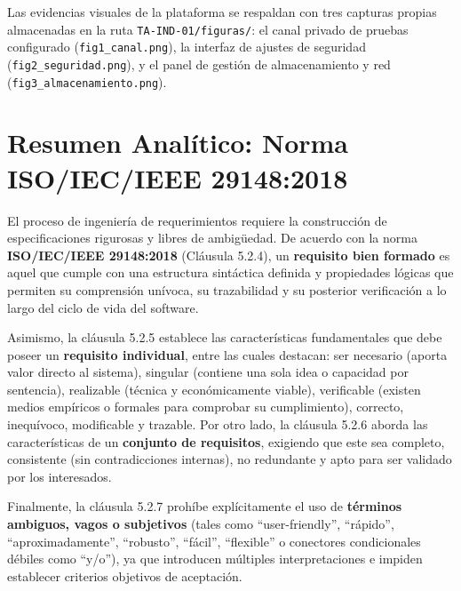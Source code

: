 \documentclass[11pt,a4paper]{article}
\begin{document}
Las evidencias visuales de la plataforma se respaldan con tres capturas propias almacenadas en la ruta \texttt{TA-IND-01/figuras/}: el canal privado de pruebas configurado (\texttt{fig1\_canal.png}), la interfaz de ajustes de seguridad (\texttt{fig2\_seguridad.png}), y el panel de gestión de almacenamiento y red (\texttt{fig3\_almacenamiento.png}).

\section{Resumen Analítico: Norma ISO/IEC/IEEE 29148:2018}
El proceso de ingeniería de requerimientos requiere la construcción de especificaciones rigurosas y libres de ambigüedad. De acuerdo con la norma \textbf{ISO/IEC/IEEE 29148:2018} (Cláusula 5.2.4), un \textbf{requisito bien formado} es aquel que cumple con una estructura sintáctica definida y propiedades lógicas que permiten su comprensión unívoca, su trazabilidad y su posterior verificación a lo largo del ciclo de vida del software. 

Asimismo, la cláusula 5.2.5 establece las características fundamentales que debe poseer un \textbf{requisito individual}, entre las cuales destacan: ser necesario (aporta valor directo al sistema), singular (contiene una sola idea o capacidad por sentencia), realizable (técnica y económicamente viable), verificable (existen medios empíricos o formales para comprobar su cumplimiento), correcto, inequívoco, modificable y trazable. Por otro lado, la cláusula 5.2.6 aborda las características de un \textbf{conjunto de requisitos}, exigiendo que este sea completo, consistente (sin contradicciones internas), no redundante y apto para ser validado por los interesados.

Finalmente, la cláusula 5.2.7 prohíbe explícitamente el uso de \textbf{términos ambiguos, vagos o subjetivos} (tales como ``user-friendly'', ``rápido'', ``aproximadamente'', ``robusto'', ``fácil'', ``flexible'' o conectores condicionales débiles como ``y/o''), ya que introducen múltiples interpretaciones e impiden establecer criterios objetivos de aceptación.

\end{document}
